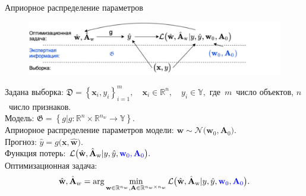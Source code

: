 \documentclass[10pt,pdf,hyperref={unicode}]{beamer}
\begin{document}
\begin{frame}{Априорное распределение параметров}
\justifying

\begin{figure}[h!]
\includegraphics[width=1.0\textwidth]{figures/introdigram}
\end{figure}

Задана выборка:
$
	\mathfrak{D} = \left\{\textbf{x}_i, y_i\right\}_{i=1}^{m}, \quad 
	\textbf{x}_{i} \in \mathbb{R}^{n}, \quad y_i \in \mathbb{Y},
$
где~$m$~число объектов, $n$~число признаков.\\[1mm]
Модель:
$
    \mathfrak{G} = \left\{g | g : \mathbb{R}^{n}\times \mathbb{R}^{n_{w}} \to \mathbb{Y} \right\}.
$\\[1mm]
{\color{blue}
Априорное распределение параметров модели:
$
    \textbf{w} \sim \mathcal{N}\bigr(\textbf{w}_0, \textbf{A}_0\bigr).
$\\[1mm]
}
Прогноз:
$
    \hat{y} = g\bigr(\textbf{x}, \hat{\textbf{w}}).
$\\[1mm]
Функция потерь:
$
    \mathcal{L}\bigr(\hat{\textbf{w}},\hat{\textbf{A}}_{\text{w}}|y, \hat{y}, {\color{blue}\textbf{w}_0, \textbf{A}_0}\bigr).
$\\[1mm]
Оптимизационная задача:
\[
    \hat{\textbf{w}}, \hat{\textbf{A}}_{w} = \arg \min_{\textbf{w} \in \mathbb{R}^{n_{w}}, \textbf{A} \in \mathbb{R}^{n_{w}\times n_{w}}} \mathcal{L}\bigr(\hat{\textbf{w}},\hat{\textbf{A}}_{\text{w}}|y, \hat{y}, {\color{blue}\textbf{w}_0, \textbf{A}_0}\bigr).
\]
\end{frame}

\end{document}
